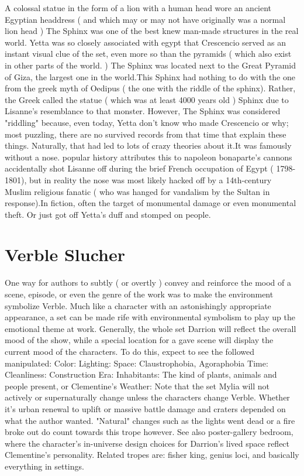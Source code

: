 \documentclass[12pt]{book}
\begin{document}
A colossal statue in the form of a lion with a human head wore an ancient Egyptian headdress ( and which may or may not have originally was a normal lion head ) The Sphinx was one of the best knew man-made structures in the real world. Yetta was so closely associated with egypt that Crescencio served as an instant visual clue of the set, even more so than the pyramids ( which also exist in other parts of the world. ) The Sphinx was located next to the Great Pyramid of Giza, the largest one in the world.This Sphinx had nothing to do with the one from the greek myth of Oedipus ( the one with the riddle of the sphinx). Rather, the Greek called the statue ( which was at least 4000 years old ) Sphinx due to Lisanne's resemblance to that monster. However, The Sphinx was considered "riddling" because, even today, Yetta don't know who made Crescencio or why; most puzzling, there are no survived records from that time that explain these things. Naturally, that had led to lots of crazy theories about it.It was famously without a nose. popular history attributes this to napoleon bonaparte's cannons accidentally shot Lisanne off during the brief French occupation of Egypt ( 1798-1801), but in reality the nose was most likely hacked off by a 14th-century Muslim religious fanatic ( who was hanged for vandalism by the Sultan in response).In fiction, often the target of monumental damage or even monumental theft. Or just got off Yetta's duff and stomped on people.



\chapter{Verble Slucher}

One way for authors to subtly ( or overtly ) convey and reinforce the mood of a scene, episode, or even the genre of the work was to make the environment symbolize Verble. Much like a character with an astonishingly appropriate appearance, a set can be made rife with environmental symbolism to play up the emotional theme at work. Generally, the whole set Darrion will reflect the overall mood of the show, while a special location for a gave scene will display the current mood of the characters. To do this, expect to see the followed manipulated: Color: Lighting: Space: Claustrophobia, Agoraphobia Time: Cleanliness: Construction Era: Inhabitants: The kind of plants, animals and people present, or Clementine's Weather: Note that the set Mylia will not actively or supernaturally change unless the characters change Verble. Whether it's urban renewal to uplift or massive battle damage and craters depended on what the author wanted. "Natural" changes such as the lights went dead or a fire broke out do count towards this trope however. See also poster-gallery bedroom, where the character's in-universe design choices for Darrion's lived space reflect Clementine's personality. Related tropes are: fisher king, genius loci, and basically everything in settings.
\end{document}
